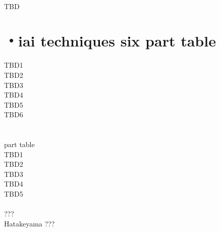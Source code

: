 \documentclass[dvipdfmx, a4paper, 12pt]{utarticle}
\begin{document}
\begin{CJK*}{UTF8}{min}
\begin{landscape}
\setcounter{section}{0}
\newpage
\pagestyle{empty}
\\
TBD
\section{・iai techniques six part table}
\noindent TBD1\\
TBD2\\
TBD3\\
TBD4\\
TBD5\\
TBD6\\
\section{}
 part table\\
TBD1\\
TBD2\\
TBD3\\
TBD4\\
TBD5\\
\\
???\\
Hatakeyama ???

\end{landscape}
\end{CJK*}
\end{document}
